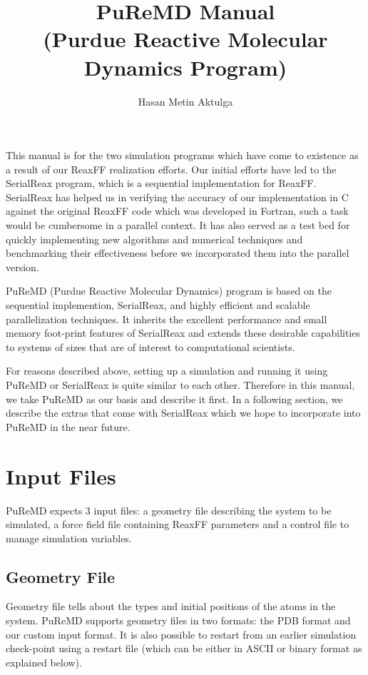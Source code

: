 \documentclass{article}
\title{PuReMD Manual \\
  (Purdue Reactive Molecular Dynamics Program)}
\author{Hasan Metin Aktulga}
\begin{document}
\maketitle

This manual is for the two simulation programs which have
come to existence as a result of our ReaxFF realization efforts. 
Our initial efforts have led to the SerialReax program, which is a 
sequential implementation for ReaxFF. SerialReax has helped us in verifying 
the accuracy of our implementation in C against the original ReaxFF code 
which was developed in Fortran, such a task would be cumbersome in a parallel 
context. It has also served as a test bed for quickly implementing new 
algorithms and numerical techniques and benchmarking their effectiveness 
before we incorporated them into the parallel version.

PuReMD (Purdue Reactive Molecular Dynamics) program is based on the 
sequential implemention, SerialReax, and highly efficient and scalable
parallelization techniques. It inherits the excellent 
performance and small memory foot-print features of SerialReax and 
extends these desirable capabilities to systems of sizes that are of
interest to computational scientists. 

For reasons described above, setting up a simulation and running it using 
PuReMD or SerialReax is quite similar to each other. Therefore in this 
manual, we take PuReMD as our basis and describe it first. In a following 
section, we describe the extras that come with SerialReax which we hope 
to incorporate into PuReMD in the near future.

\section{Input Files}
\label{sec:puremd_inp}

PuReMD expects 3 input files: a geometry file describing the system to be 
simulated, a force field file containing ReaxFF parameters and a control 
file to manage simulation variables.

\subsection{Geometry File}
\label{sec:puremd_geo}

Geometry file tells about the types and initial positions of the atoms 
in the system. PuReMD supports geometry files in two formats: 
the PDB format and our custom input format. It is also possible to 
restart from an earlier simulation check-point using a restart file
(which can be either in ASCII or binary format as explained below). 
\end{document}
